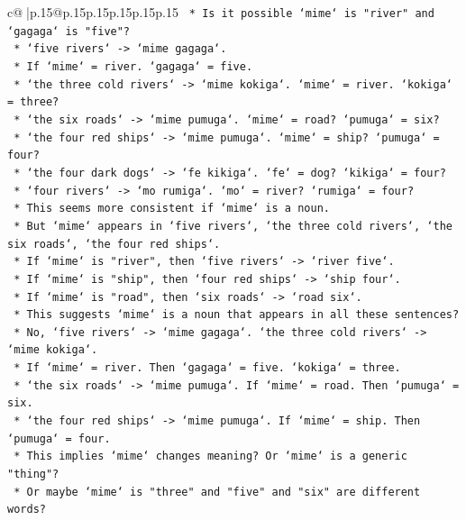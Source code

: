 \documentclass{article}
\begin{document}
{\begin{supertabular}{c@{$\;$}|p{.15\linewidth}@{}p{.15\linewidth}p{.15\linewidth}p{.15\linewidth}p{.15\linewidth}p{.15\linewidth}}
{{{\texttt{            *   Is it possible `mime` is "river" and `gagaga` is "five"?} \\
\texttt{            *   `five rivers` {-}> `mime gagaga`.} \\
\texttt{            *   If `mime` = river. `gagaga` = five.} \\
\texttt{            *   `the three cold rivers` {-}> `mime kokiga`. `mime` = river. `kokiga` = three?} \\
\texttt{            *   `the six roads` {-}> `mime pumuga`. `mime` = road? `pumuga` = six?} \\
\texttt{            *   `the four red ships` {-}> `mime pumuga`. `mime` = ship? `pumuga` = four?} \\
\texttt{            *   `the four dark dogs` {-}> `fe kikiga`. `fe` = dog? `kikiga` = four?} \\
\texttt{            *   `four rivers` {-}> `mo rumiga`. `mo` = river? `rumiga` = four?} \\
\texttt{            *   This seems more consistent if `mime` is a noun.} \\
\texttt{            *   But `mime` appears in `five rivers`, `the three cold rivers`, `the six roads`, `the four red ships`.} \\
\texttt{            *   If `mime` is "river", then `five rivers` {-}> `river five`.} \\
\texttt{            *   If `mime` is "ship", then `four red ships` {-}> `ship four`.} \\
\texttt{            *   If `mime` is "road", then `six roads` {-}> `road six`.} \\
\texttt{            *   This suggests `mime` is a noun that appears in all these sentences?} \\
\texttt{            *   No, `five rivers` {-}> `mime gagaga`. `the three cold rivers` {-}> `mime kokiga`.} \\
\texttt{            *   If `mime` = river. Then `gagaga` = five. `kokiga` = three.} \\
\texttt{            *   `the six roads` {-}> `mime pumuga`. If `mime` = road. Then `pumuga` = six.} \\
\texttt{            *   `the four red ships` {-}> `mime pumuga`. If `mime` = ship. Then `pumuga` = four.} \\
\texttt{            *   This implies `mime` changes meaning? Or `mime` is a generic "thing"?} \\
\texttt{            *   Or maybe `mime` is "three" and "five" and "six" are different words?} \\
}}}
\end{supertabular}}
\end{document}
